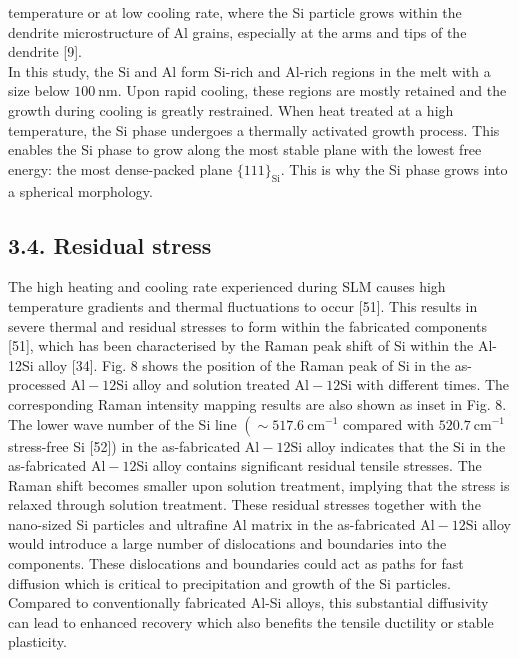 \documentclass[10pt]{article}
\begin{document}
temperature or at low cooling rate, where the Si particle grows within the dendrite microstructure of Al grains, especially at the arms and tips of the dendrite [9].\\
In this study, the $\mathrm{Si}$ and $\mathrm{Al}$ form $\mathrm{Si}$-rich and $\mathrm{Al}$-rich regions in the melt with a size below $100 \mathrm{~nm}$. Upon rapid cooling, these regions are mostly retained and the growth during cooling is greatly restrained. When heat treated at a high temperature, the Si phase undergoes a thermally activated growth process. This enables the Si phase to grow along the most stable plane with the lowest free energy: the most dense-packed plane $\{111\}_{\mathrm{Si}}$. This is why the Si phase grows into a spherical morphology.

\subsection*{3.4. Residual stress}
The high heating and cooling rate experienced during SLM causes high temperature gradients and thermal fluctuations to occur [51]. This results in severe thermal and residual stresses to form within the fabricated components [51], which has been characterised by the Raman peak shift of Si within the Al-12Si alloy [34]. Fig. 8 shows the position of the Raman peak of Si in the as-processed $\mathrm{Al}-12 \mathrm{Si}$ alloy and solution treated $\mathrm{Al}-12 \mathrm{Si}$ with different times. The corresponding Raman intensity mapping results are also shown as inset in Fig. 8. The lower wave number of the Si line $\left(\sim 517.6 \mathrm{~cm}^{-1}\right.$ compared with $520.7 \mathrm{~cm}^{-1}$ stress-free Si [52]) in the as-fabricated $\mathrm{Al}-12 \mathrm{Si}$ alloy indicates that the $\mathrm{Si}$ in the as-fabricated $\mathrm{Al}-12 \mathrm{Si}$ alloy contains significant residual tensile stresses. The Raman shift becomes smaller upon solution treatment, implying that the stress is relaxed through solution treatment. These residual stresses together with the nano-sized Si particles and ultrafine $\mathrm{Al}$ matrix in the as-fabricated $\mathrm{Al}-12 \mathrm{Si}$ alloy would introduce a large number of dislocations and boundaries into the components. These dislocations and boundaries could act as paths for fast diffusion which is critical to precipitation and growth of the Si particles. Compared to conventionally fabricated Al-Si alloys, this substantial diffusivity can lead to enhanced recovery which also benefits the tensile ductility or stable plasticity.
\end{document}
